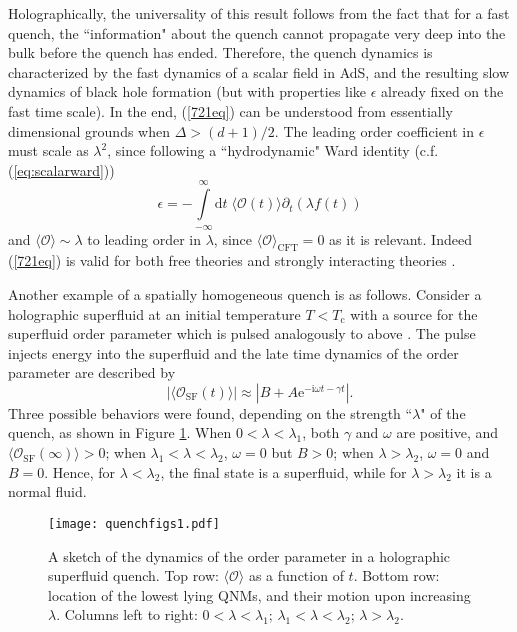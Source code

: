 \documentclass[10pt, oneside]{book}
\begin{document}
\begin{doublespace}
Holographically, the universality of this result follows from the fact that for a fast quench, the ``information" about the quench cannot propagate very deep into the bulk before the quench has ended.   Therefore, the quench dynamics is characterized by the fast dynamics of a scalar field in AdS, and the resulting slow dynamics of black hole formation (but with properties like $\epsilon$ already fixed on the fast time scale).   In the end, (\ref{721eq}) can be understood from essentially dimensional grounds when $\Delta>(d+1)/2$.    The leading order coefficient in $\epsilon $ must scale as $\lambda^2$, since following a ``hydrodynamic" Ward identity (c.f. (\ref{eq:scalarward}))  \begin{equation}
\epsilon = -\int\limits_{-\infty}^\infty \mathrm{d}t \; \langle \mathcal{O}(t)\rangle \partial_t (\lambda f(t))
\end{equation}and $\langle \mathcal{O}\rangle \sim \lambda$ to leading order in $\lambda$, since $\langle \mathcal{O}\rangle_{\mathrm{CFT}} = 0$ as it is relevant.    Indeed (\ref{721eq}) is valid for both free theories and strongly interacting theories \cite{Das:2014jna}.

Another example of a spatially homogeneous quench is as follows.   Consider a holographic superfluid at an initial temperature $T<T_{\mathrm{c}}$ with a source for the superfluid order parameter which is pulsed analogously to above \cite{Bhaseen:2012gg}.    The pulse injects energy into the superfluid and the late time dynamics of the order parameter are described by \begin{equation}
\left|\langle \mathcal{O}_{\mathrm{SF}}(t)\rangle \right| \approx \left|  B+ A\mathrm{e}^{-\mathrm{i}\omega t - \gamma t}\right|.   \label{sfquencheq}
\end{equation}
Three possible behaviors were found, depending on the strength ``$\lambda$" of the quench, as shown in Figure \ref{fig:quenchfig1}.   When $0<\lambda<\lambda_1$,  both $\gamma$ and $\omega$ are positive, and $\langle \mathcal{O}_{\mathrm{SF}}(\infty)\rangle > 0$;  when $\lambda_1<\lambda<\lambda_2$, $\omega=0$ but $B > 0$;  when $\lambda>\lambda_2$, $\omega=0$ and $B = 0$.   Hence, for $\lambda<\lambda_2$, the final state is a superfluid,  while for $\lambda>\lambda_2$ it is a normal fluid.

\begin{figure}[h]
\centering
\texttt{[image: quenchfigs1.pdf]}
\caption{A sketch of the dynamics of the order parameter in a holographic superfluid quench.   Top row: $\langle \mathcal{O}\rangle$ as a function of $t$.  Bottom row: location of the lowest lying QNMs, and their motion upon increasing $\lambda$.   Columns left to right:   $0<\lambda<\lambda_1$;  $\lambda_1<\lambda<\lambda_2$;  $\lambda>\lambda_2$.}
\label{fig:quenchfig1}
\end{figure}


\end{doublespace}
\end{document}
